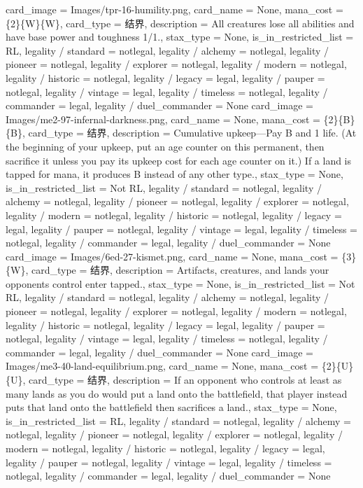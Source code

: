 \documentclass[lang = cn, color = black, 10pt]{AllThatStax}
\begin{document}
\card
{
	card_image = Images/tpr-16-humility.png,
	card_name = None,
	mana_cost = \{2\}\{W\}\{W\},
	card_type = 结界,
	description = All creatures lose all abilities and have base power and toughness 1/1.,
	stax_type = None,
	is_in_restricted_list = RL,
	legality / standard = notlegal,
	legality / alchemy = notlegal,
	legality / pioneer = notlegal,
	legality / explorer = notlegal,
	legality / modern = notlegal,
	legality / historic = notlegal,
	legality / legacy = legal,
	legality / pauper = notlegal,
	legality / vintage = legal,
	legality / timeless = notlegal,
	legality / commander = legal,
	legality / duel_commander = None
}
\card
{
	card_image = Images/me2-97-infernal-darkness.png,
	card_name = None,
	mana_cost = \{2\}\{B\}\{B\},
	card_type = 结界,
	description = Cumulative upkeep—Pay {B} and 1 life. (At the beginning of your upkeep, put an age counter on this permanent, then sacrifice it unless you pay its upkeep cost for each age counter on it.)
	If a land is tapped for mana, it produces {B} instead of any other type.,
	stax_type = None,
	is_in_restricted_list = Not RL,
	legality / standard = notlegal,
	legality / alchemy = notlegal,
	legality / pioneer = notlegal,
	legality / explorer = notlegal,
	legality / modern = notlegal,
	legality / historic = notlegal,
	legality / legacy = legal,
	legality / pauper = notlegal,
	legality / vintage = legal,
	legality / timeless = notlegal,
	legality / commander = legal,
	legality / duel_commander = None
}
\card
{
	card_image = Images/6ed-27-kismet.png,
	card_name = None,
	mana_cost = \{3\}\{W\},
	card_type = 结界,
	description = Artifacts, creatures, and lands your opponents control enter tapped.,
	stax_type = None,
	is_in_restricted_list = Not RL,
	legality / standard = notlegal,
	legality / alchemy = notlegal,
	legality / pioneer = notlegal,
	legality / explorer = notlegal,
	legality / modern = notlegal,
	legality / historic = notlegal,
	legality / legacy = legal,
	legality / pauper = notlegal,
	legality / vintage = legal,
	legality / timeless = notlegal,
	legality / commander = legal,
	legality / duel_commander = None
}
\card
{
	card_image = Images/me3-40-land-equilibrium.png,
	card_name = None,
	mana_cost = \{2\}\{U\}\{U\},
	card_type = 结界,
	description = If an opponent who controls at least as many lands as you do would put a land onto the battlefield, that player instead puts that land onto the battlefield then sacrifices a land.,
	stax_type = None,
	is_in_restricted_list = RL,
	legality / standard = notlegal,
	legality / alchemy = notlegal,
	legality / pioneer = notlegal,
	legality / explorer = notlegal,
	legality / modern = notlegal,
	legality / historic = notlegal,
	legality / legacy = legal,
	legality / pauper = notlegal,
	legality / vintage = legal,
	legality / timeless = notlegal,
	legality / commander = legal,
	legality / duel_commander = None
}
\end{document}
